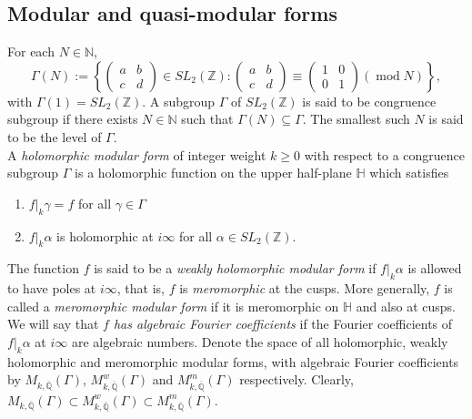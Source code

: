 \documentclass[11pt, reqno]{amsart}
\begin{document}
\subsection{Modular and quasi-modular forms}
For each $N\in \mathbb{N}$, $$
\Gamma(N):=\left\{  \left( 
\begin{array}{cc}
  a & b \\
  c & d
\end{array}
\right)\in SL_2(\mathbb{Z}):\left( 
\begin{array}{cc}
  a & b \\
  c & d
\end{array}
\right)\equiv \left( 
\begin{array}{cc}
  1 & 0 \\
  0 & 1
\end{array}
\right) (\operatorname{mod}N) \right\},
$$ 
with $\Gamma(1)=SL_2(\mathbb{Z})$. A subgroup $\Gamma$ of $SL_2(\mathbb{Z})$ is said to be congruence subgroup if there exists $N\in \mathbb{N}$ such that $\Gamma(N)\subseteq \Gamma$. The smallest such $N$ is said to be the level of $\Gamma$.\\

A \emph{holomorphic modular form} of integer weight $k \geq 0$ with respect to a congruence subgroup $\Gamma$ is a holomorphic function on the upper half-plane $\mathbb{H}$ which satisfies 
\begin{enumerate}
    \item[(i)] $f \big|_k \gamma = f$ for all $\gamma \in \Gamma$
    \item[(ii)] $f \big|_k \alpha$ is holomorphic at $i\infty$ for all $\alpha \in SL_2(\mathbb{Z})$.
\end{enumerate}
The function $f$ is said to be a \emph{weakly holomorphic modular form} if $f \big|_k \alpha$ is allowed to have poles at $i\infty$, that is, $f$ is \emph{meromorphic} at the cusps. More generally, $f$ is called a \emph{meromorphic modular form} if it is meromorphic on $\mathbb{H}$ and also at cusps. \\

We will say that \emph{$f$ has algebraic Fourier coefficients} if the Fourier coefficients of $f \big|_k \alpha$ at $i \infty$ are algebraic numbers. Denote the space of all holomorphic, weakly holomorphic and meromorphic modular forms, with algebraic Fourier coefficients by $M_{k,\overline{\mathbb{Q}}}(\Gamma)$, $M_{k,\overline{\mathbb{Q}}}^w(\Gamma)$ and $M_{k,\overline{\mathbb{Q}}}^m(\Gamma)$ respectively. Clearly, $M_{k,\overline{\mathbb{Q}}}(\Gamma)\subset M_{k,\overline{\mathbb{Q}}}^w(\Gamma)\subset M_{k,\overline{\mathbb{Q}}}^m(\Gamma)$. \\
\end{document}
